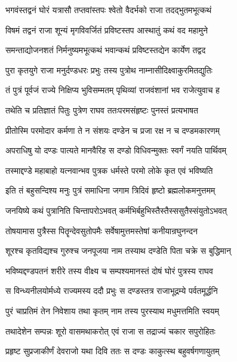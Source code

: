 
\twolineshloka
{भगवंस्तद्वनं घोरं यत्रासौ तप्तवांस्तपः}
{श्वेतो वैदर्भको राजा तदद्भुतमभूत्कथं}%

\twolineshloka
{विषमं तद्वनं राजा शून्यं मृगविवर्जितं}
{प्रविष्टस्तप आस्थातुं कथं वद महामुने}%

\twolineshloka
{समन्ताद्योजनशतं निर्मनुष्यमभूत्कथं}
{भवान्कथं प्रविष्टस्तद्येन कार्येण तद्वद}%


\twolineshloka
{पुरा कृतयुगे राजा मनुर्दण्डधरः प्रभुः}
{तस्य पुत्रोथ नाम्नासीदिक्ष्वाकुरमितद्युतिः}%

\twolineshloka
{तं पुत्रं पूर्वजं राज्ये निक्षिप्य भुविसम्मतम्}
{पृथिव्यां राजवंशानां भव राजेत्युवाच ह}%

\twolineshloka
{तथेति च प्रतिज्ञातं पितुः पुत्रेण राघव}
{ततःपरमसंहृष्टः पुनस्तं प्रत्यभाषत}%

\twolineshloka
{प्रीतोस्मि परमोदार कर्मणा ते न संशयः}
{दण्डेन च प्रजा रक्ष न च दण्डमकारणम्}%

\twolineshloka
{अपराधिषु यो दण्डः पात्यते मानवैरिह}
{स दण्डो विधिवन्मुक्तः स्वर्गं नयति पार्थिवम्}%

\twolineshloka
{तस्माद्दण्डे महाबाहो यत्नवान्भव पुत्रक}
{धर्मस्ते परमो लोके कृत एवं भविष्यति}%

\twolineshloka
{इति तं बहुसन्दिश्य मनुः पुत्रं समाधिना}
{जगाम त्रिदिवं हृष्टो ब्रह्मलोकमनुत्तमम्}%

\twolineshloka
{जनयिष्ये कथं पुत्रानिति चिन्तापरोऽभवत्}
{कर्मभिर्बहुभिस्तैस्तैस्ससुतैस्संयुतोऽभवत्}%

\twolineshloka
{तोषयामास पुत्रैस्स पितॄन्देवसुतोपमैः}
{सर्वेषामुत्तमस्तेषां कनीयान्रघुनन्दन}%

\twolineshloka
{शूरश्च कृतविद्यश्च गुरुश्च जनपूजया}
{नाम तस्याथ दण्डेति पिता चक्रे स बुद्धिमान्}%

\twolineshloka
{भविष्यद्दण्डपतनं शरीरे तस्य वीक्ष्य च}
{सम्पश्यमानस्तं दोषं घोरं पुत्रस्य राघव}%

\twolineshloka
{स विन्ध्यनीलयोर्मध्ये राज्यमस्य ददौ प्रभुः}
{स दण्डस्तत्र राजाभूद्रम्ये पर्वतमूर्द्धनि}%

\twolineshloka
{पुरं चाप्रतिमं तेन निवेशाय तथा कृतम्}
{नाम तस्य पुरस्याथ मधुमत्तमिति स्वयम्}%

\twolineshloka
{तथादेशेन सम्पन्नः शूरो वासमथाकरोत्}
{एवं राजा स तद्राज्यं चकार सपुरोहितः}%

\twolineshloka
{प्रहृष्ट सुप्रजाकीर्णं देवराजो यथा दिवि}
{ततः स दण्डः काकुत्स्थ बहुवर्षगणायुतम्}%


